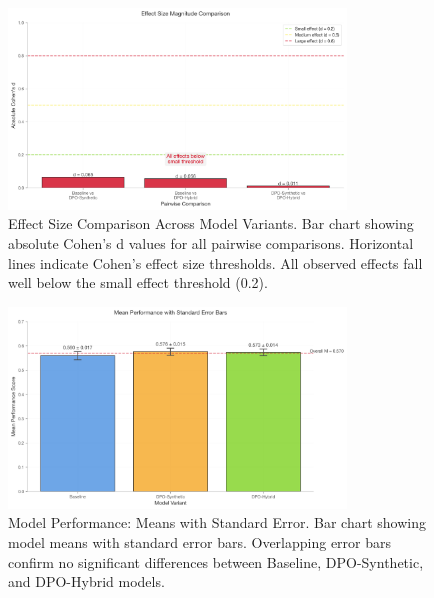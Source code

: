 \begin{figure}[htbp]
    \centering
    \includegraphics[width=0.8\textwidth]{figures/effect_size_comparison.png}
    \caption{Effect Size Comparison Across Model Variants. Bar chart showing absolute Cohen's d values for all pairwise comparisons. Horizontal lines indicate Cohen's effect size thresholds. All observed effects fall well below the small effect threshold (0.2).}
    \label{fig:effect-size-comparison}
\end{figure}

\begin{figure}[htbp]
    \centering
    \includegraphics[width=0.8\textwidth]{figures/means_comparison.png}
    \caption{Model Performance: Means with Standard Error. Bar chart showing model means with standard error bars. Overlapping error bars confirm no significant differences between Baseline, DPO-Synthetic, and DPO-Hybrid models.}
    \label{fig:means-comparison}
\end{figure}
